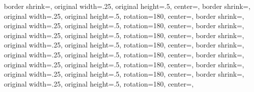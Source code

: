 {  {%
	border shrink=\pgfpageoptionborder,%
	original width=.25\pgfpageoptionheight,%
	original height=.5\pgfpageoptionwidth,%
	center=\pgfpoint{.5\pgfphysicalwidth}{.25\pgfphysicalheight},%
  }%
%
%
  {%
	border shrink=\pgfpageoptionborder,%
	original width=.25\pgfpageoptionheight,%
	original height=.5\pgfpageoptionwidth,%
	rotation=180,%
	center=\pgfpoint{\pgfphysicalwidth}{.75\pgfphysicalheight},%
  }%
  {%
	border shrink=\pgfpageoptionborder,%
	original width=.25\pgfpageoptionheight,%
	original height=.5\pgfpageoptionwidth,%
	rotation=180,%
	center=\pgfpoint{.5\pgfphysicalwidth}{.75\pgfphysicalheight},%
	}%
  {%
	border shrink=\pgfpageoptionborder,%
	original width=.25\pgfpageoptionheight,%
	original height=.5\pgfpageoptionwidth,%
	rotation=180,%
	center=\pgfpoint{\pgfphysicalwidth}{.5\pgfphysicalheight},%
  }%
  {%
	border shrink=\pgfpageoptionborder,%
	original width=.25\pgfpageoptionheight,%
	original height=.5\pgfpageoptionwidth,%
	rotation=180,%
	center=\pgfpoint{.5\pgfphysicalwidth}{.5\pgfphysicalheight},%
  }%
  {%
	border shrink=\pgfpageoptionborder,%
	original width=.25\pgfpageoptionheight,%
	original height=.5\pgfpageoptionwidth,%
	rotation=180,%
	center=\pgfpoint{\pgfphysicalwidth}{.25\pgfphysicalheight},%
  }%
  {%
	border shrink=\pgfpageoptionborder,%
	original width=.25\pgfpageoptionheight,%
	original height=.5\pgfpageoptionwidth,%
	rotation=180,%
	center=\pgfpoint{.5\pgfphysicalwidth}{.25\pgfphysicalheight},%
  }%
  {%
	border shrink=\pgfpageoptionborder,%
	original width=.25\pgfpageoptionheight,%
	original height=.5\pgfpageoptionwidth,%
	rotation=180,%
	center=\pgfpoint{\pgfphysicalwidth}{0\pgfphysicalheight},%
  }%
  {%
	border shrink=\pgfpageoptionborder,%
	original width=.25\pgfpageoptionheight,%
	original height=.5\pgfpageoptionwidth,%
	rotation=180,%
	center=\pgfpoint{.5\pgfphysicalwidth}{0\pgfphysicalheight},%
  }%
}%